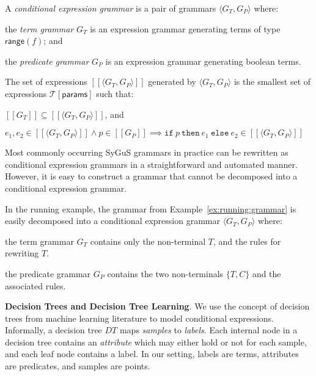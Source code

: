 \documentclass{llncs}
\newcommand\tuple[1]{\langle #1 \rangle}
\newcommand\Expr{e}
\newcommand\Pred{p}
\newcommand\Grammar{G}
\newcommand\sem[1]{[\![ #1 ]\!]}
\newcommand\SynthFun{f}
\newcommand\range{\mathsf{range}}
\newcommand\FormalParameters{\mathsf{params}}
\newcommand\Theory{\mathcal{T}}
\newcommand\ITE[3]{\mathtt{if}~#1~\mathtt{then}~#2~\mathtt{else}~#3}
\newcommand\DecisionTree{\mathit{DT}}
\newcommand{\sygus}{{\sffamily\fontsize{8.5}{10}\selectfont
    SyGuS}\xspace}
\renewcommand{\paragraph}[1]{\par\noindent\textbf{#1}.}
\begin{document}
A {\em conditional expression grammar} is a pair of grammars $\tuple{
\Grammar_T, \Grammar_P }$ where:
\begin{inparaenum}[(a)]
\item the {\em term grammar} $\Grammar_T$ is an expression grammar
  generating terms of type $\range(\SynthFun)$; and
\item the {\em predicate grammar} $\Grammar_P$ is an expression
  grammar generating boolean terms.
\end{inparaenum}
The set of expressions $\sem{\tuple{ \Grammar_T, \Grammar_P }}$
generated by $\tuple{ G_T, G_P }$ is the smallest set of expressions
$\Theory[\FormalParameters]$ such that:
\begin{inparaenum}[(a)]
\item $\sem{\Grammar_T} \subseteq \sem{\tuple{ \Grammar_T, \Grammar_P
  }}$, and
\item $\Expr_1, \Expr_2 \in \sem{\tuple{ \Grammar_T, \Grammar_P }}
  \wedge \Pred \in \sem{\Grammar_P} \implies
  \ITE{\Pred}{\Expr_1}{\Expr_2} \in \sem{\tuple{ \Grammar_T, \Grammar_P }}$
\end{inparaenum}

Most commonly occurring \sygus grammars in practice can be rewritten
as conditional expression grammars in a straightforward and automated
manner.
However, it is easy to construct a grammar that cannot be decomposed
into a conditional expression grammar.

\begin{example}
  In the running example, the grammar from
  Example~\ref{ex:running:grammar} is easily decomposed into a
  conditional expression grammar $\tuple{\Grammar_T, \Grammar_P}$ where:
  \begin{inparaenum}[(a)]
  \item the term grammar $\Grammar_T$ contains only the non-terminal
    $T$, and the rules for rewriting $T$.
  \item the predicate grammar $\Grammar_P$ contains the two
    non-terminals $\{ T, C \}$ and the associated rules.
  \end{inparaenum}
\end{example}

\paragraph{Decision Trees and Decision Tree Learning}
We use the concept of decision trees from machine learning literature to
model conditional expressions.
Informally, a decision tree $\DecisionTree$ maps {\em samples} to {\em
labels}.
Each internal node in a decision tree contains an {\em attribute} which
may either hold or not for each sample, and each leaf node contains a
label.
In our setting, labels are terms, attributes are predicates, and samples
are points.
\end{document}
